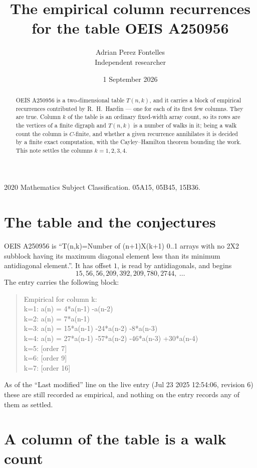 \documentclass[11pt,a4paper]{article}
\title{The empirical column recurrences for the table OEIS A250956}
\author{Adrian Perez Fontelles\\ \small Independent researcher}
\date{1 September 2026}
\theoremstyle{plain}
\theoremstyle{definition}
\begin{document}
\maketitle

\begin{abstract}
OEIS A250956 is a two-dimensional table $T(n,k)$, and it carries a block of empirical
recurrences contributed by R.~H.~Hardin --- one for each of its first few columns. They are
true. Column $k$ of the table is an ordinary fixed-width array count, so its rows are the
vertices of a finite digraph and $T(n,k)$ is a number of walks in it; being a walk count the
column is $C$-finite, and whether a given recurrence annihilates it is decided by a finite
exact computation, with the Cayley--Hamilton theorem bounding the work. This note settles the
columns $k=1, 2, 3, 4$.
\end{abstract}

\noindent\small 2020 Mathematics Subject Classification. 05A15, 05B45, 15B36.\normalsize

\section{The table and the conjectures}

OEIS A250956 is ``T(n,k)=Number of (n+1)X(k+1) 0..1 arrays with no 2X2 subblock having its maximum diagonal element less than its minimum antidiagonal element.''. It has offset $1$, is
read by antidiagonals, and begins
\[
15, 56, 56, 209, 392, 209, 780, 2744,\ \dots
\]
The entry carries the following block:
\begin{quote}\small
Empirical for column k:\\
k=1: a(n) = 4*a(n-1) -a(n-2)\\
k=2: a(n) = 7*a(n-1)\\
k=3: a(n) = 15*a(n-1) -24*a(n-2) -8*a(n-3)\\
k=4: a(n) = 27*a(n-1) -57*a(n-2) -46*a(n-3) +30*a(n-4)\\
k=5: [order 7]\\
k=6: [order 9]\\
k=7: [order 16]\\
\end{quote}
As of the ``Last modified'' line on the live entry (Jul 23 2025 12:54:06, revision 6) these are still
recorded as empirical, and nothing on the entry records any of them as settled.

\section{A column of the table is a walk count}
\end{document}
